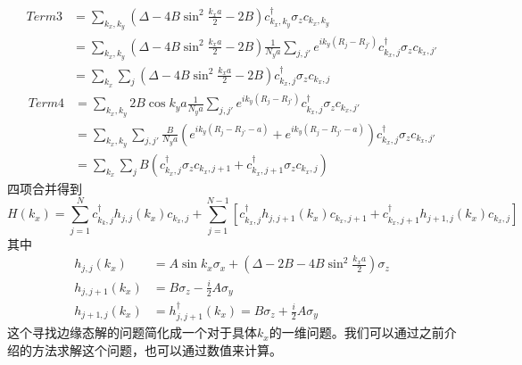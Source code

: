 \documentclass{article}
\numberwithin{equation}{subsection}
\begin{document}
\begin{equation}
    \begin{split}
        Term3&=\sum_{k_x,k_y}(\Delta-4B\sin^2\frac{k_xa}{2}-2B)c_{k_x,k_y}^\dagger\sigma_zc_{k_x,k_y}\\
        &=\sum_{k_x,k_y}(\Delta-4B\sin^2\frac{k_xa}{2}-2B)\frac{1}{N_ya}\sum_{j,j'}e^{ik_y(R_j-R_{j'})}c_{k_x,j}^\dagger\sigma_zc_{k_x,j'}\\
        &=\sum_{k_x}\sum_{j}(\Delta-4B\sin^2\frac{k_xa}{2}-2B)c_{k_x,j}^\dagger\sigma_zc_{k_x,j}
    \end{split}
\end{equation}
\begin{equation}
    \begin{split}
        Term4&=\sum_{k_x,k_y}2B\cos k_ya\frac{1}{N_ya}\sum_{j,j'}e^{ik_y(R_j-R_{j'})}c_{k_x,j}^\dagger\sigma_zc_{k_x,j'}\\
        &=\sum_{k_x,k_y}\sum_{j,j'}\frac{B}{N_ya}(e^{ik_y(R_j-R_{j'}-a)}+e^{ik_y(R_j-R_{j'}-a)})c_{k_x,j}^\dagger\sigma_zc_{k_x,j'}\\
        &=\sum_{k_x}\sum_{j}B(c_{k_x,j}^\dagger\sigma_zc_{k_x,j+1}+c_{k_x,j+1}^\dagger\sigma_zc_{k_x,j})
    \end{split}
\end{equation}
四项合并得到
\begin{equation}
    H\left(k_{x}\right)=\sum_{j=1}^{N} c_{k_{k}, j}^{\dagger} h_{j, j}\left(k_{x}\right) c_{k_{x}, j}+\sum_{j=1}^{N-1}\left[c_{k_{x}, j}^{\dagger} h_{j, j+1}\left(k_{x}\right) c_{k_{x}, j+1}+c_{k_{x}, j+1}^{\dagger} h_{j+1, j}\left(k_{x}\right) c_{k_{x}, j}\right]
\end{equation}
其中
\begin{equation}
    \begin{aligned}
        h_{j, j}\left(k_{x}\right) &=A \sin k_{x} \sigma_{x}+\left(\Delta-2 B-4 B \sin ^{2} \frac{k_{x} a}{2}\right) \sigma_{z} \\
        h_{j, j+1}\left(k_{x}\right) &=B \sigma_{z}-\frac{i}{2} A \sigma_{y} \\
        h_{j+1, j}\left(k_{x}\right) &=h_{j, j+1}^{\dagger}\left(k_{x}\right)=B \sigma_{z}+\frac{i}{2} A \sigma_{y}
    \end{aligned}
\end{equation}
这个寻找边缘态解的问题简化成一个对于具体$k_x$的一维问题。我们可以通过之前介绍的方法求解这个问题，也可以通过数值来计算。
\end{document}

